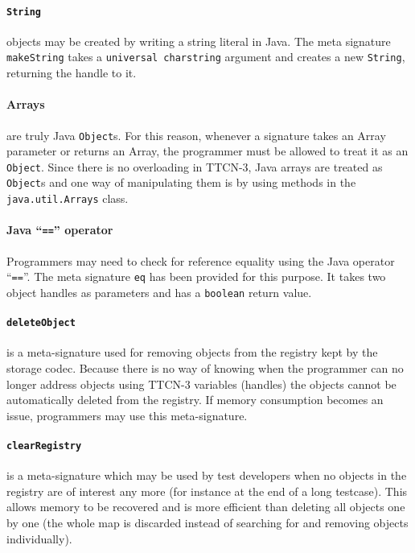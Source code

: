 \paragraph{\texttt{String}} objects may be created
by writing a string literal in Java.
The meta signature \verb=makeString= takes a \texttt{universal charstring}
argument and creates a new \verb=String=, returning the handle to it.

\paragraph{Arrays} are truly Java \verb=Object=s.
For this reason, whenever a signature takes an Array parameter
or returns an Array,
the programmer must be allowed to treat it as an \verb=Object=.
Since there is no overloading in \ac{TTCN-3},
Java arrays are treated as \verb=Object=s
and one way of manipulating them is by using methods in the
\verb=java.util.Arrays= class.

\paragraph{Java ``\texttt{==}'' operator}
Programmers may need to check for reference equality
using the Java operator ``\verb|==|''.
The meta signature \verb=eq= has been provided for this purpose.
It takes two object handles as parameters
and has a \verb=boolean= return value.

\paragraph{\texttt{deleteObject}}
is a meta-signature used for removing objects from the registry
kept by the storage codec.
Because there is no way of knowing
when the programmer can no longer address objects
using \ac{TTCN-3} variables (handles)
the objects cannot be automatically deleted from the registry.
If memory consumption becomes an issue,
programmers may use this meta-signature.

\paragraph{\texttt{clearRegistry}}
is a meta-signature which may be used by test developers
when no objects in the registry are of interest any more
(for instance at the end of a long testcase).
This allows memory to be recovered and is more efficient
than deleting all objects one by one (the whole map is discarded
instead of searching for and removing objects individually).
